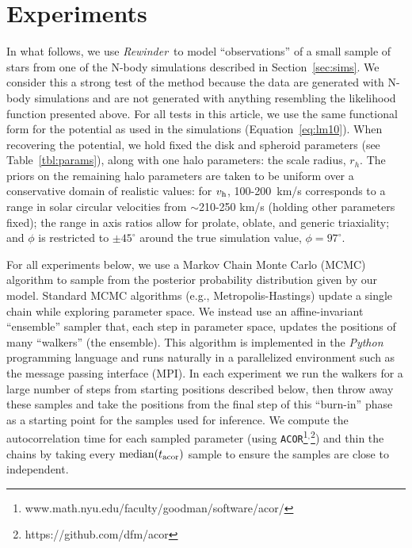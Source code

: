 \documentclass[letterpaper,12pt,preprint]{aastex}
\newcommand{\project}[1]{\textsl{#1}}
\newcommand{\vhalo}{v_{\rm h}}
\newcommand{\rewinder}{\emph{Rewinder}}
\begin{document}
\section{Experiments} \label{sec:experiments}
In what follows, we use \rewinder\ to model ``observations'' of a small sample of stars from one of the N-body simulations described in Section~\ref{sec:sims}. We consider this a strong test of the method because the data are generated with N-body simulations and are not generated with anything resembling the likelihood function presented above. For all tests in this article, we use the same functional form for the potential as used in the simulations (Equation~\ref{eq:lm10}). When recovering the potential, we hold fixed the disk and spheroid parameters (see Table~\ref{tbl:params}), along with one halo parameters: the scale radius, $r_h$. The priors on the remaining halo parameters are taken to be uniform over a conservative domain of realistic values: for $\vhalo$, 100-200~km/s corresponds to a range in solar circular velocities from $\sim$210-250 km/s (holding other parameters fixed); the range in axis ratios allow for prolate, oblate, and generic triaxiality; and $\phi$ is restricted to $\pm45^\circ$ around the true simulation value, $\phi = 97^\circ$.

For all experiments below, we use a Markov Chain Monte Carlo (MCMC) algorithm to sample from the posterior probability distribution given by our model. Standard MCMC algorithms (e.g., Metropolis-Hastings) update a single chain while exploring parameter space. We instead use an affine-invariant ``ensemble'' sampler \citep{goodman10} that, each step in parameter space, updates the positions of many ``walkers'' (the ensemble). This algorithm is implemented in the \project{Python} programming language \citep{foremanmackey13} and runs naturally in a parallelized environment such as the message passing interface (MPI). In each experiment we run the walkers for a large number of steps from starting positions described below, then throw away these samples and take the positions from the final step of this ``burn-in'' phase as a starting point for the samples used for inference. We compute the autocorrelation time for each sampled parameter (using \texttt{ACOR}\footnote{www.math.nyu.edu/faculty/goodman/software/acor/}$^{,}$\footnote{https://github.com/dfm/acor}) and thin the chains by taking every $\mathrm{median}(t_{\rm acor})$ sample to ensure the samples are close to independent.
\end{document}
